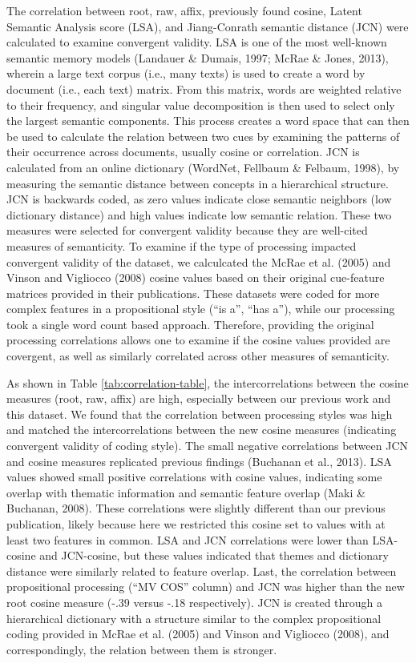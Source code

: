 \documentclass[english,,man]{apa6}
\theoremstyle{definition}
\theoremstyle{definition}
\theoremstyle{definition}
\theoremstyle{remark}
\begin{document}
The correlation between root, raw, affix, previously found cosine,
Latent Semantic Analysis score (LSA), and Jiang-Conrath semantic
distance (JCN) were calculated to examine convergent validity. LSA is
one of the most well-known semantic memory models (Landauer \& Dumais,
1997; McRae \& Jones, 2013), wherein a large text corpus (i.e., many
texts) is used to create a word by document (i.e., each text) matrix.
From this matrix, words are weighted relative to their frequency, and
singular value decomposition is then used to select only the largest
semantic components. This process creates a word space that can then be
used to calculate the relation between two cues by examining the
patterns of their occurrence across documents, usually cosine or
correlation. JCN is calculated from an online dictionary (WordNet,
Fellbaum \& Felbaum, 1998), by measuring the semantic distance between
concepts in a hierarchical structure. JCN is backwards coded, as zero
values indicate close semantic neighbors (low dictionary distance) and
high values indicate low semantic relation. These two measures were
selected for convergent validity because they are well-cited measures of
semanticity. To examine if the type of processing impacted convergent
validity of the dataset, we calculcated the McRae et al. (2005) and
Vinson and Vigliocco (2008) cosine values based on their original
cue-feature matrices provided in their publications. These datasets were
coded for more complex features in a propositional style (\enquote{is
a}, \enquote{has a}), while our processing took a single word count
based approach. Therefore, providing the original processing
correlations allows one to examine if the cosine values provided are
covergent, as well as similarly correlated across other measures of
semanticity.

As shown in Table \ref{tab:correlation-table}, the intercorrelations
between the cosine measures (root, raw, affix) are high, especially
between our previous work and this dataset. We found that the
correlation between processing styles was high and matched the
intercorrelations between the new cosine measures (indicating convergent
validity of coding style). The small negative correlations between JCN
and cosine measures replicated previous findings (Buchanan et al.,
2013). LSA values showed small positive correlations with cosine values,
indicating some overlap with thematic information and semantic feature
overlap (Maki \& Buchanan, 2008). These correlations were slightly
different than our previous publication, likely because here we
restricted this cosine set to values with at least two features in
common. LSA and JCN correlations were lower than LSA-cosine and
JCN-cosine, but these values indicated that themes and dictionary
distance were similarly related to feature overlap. Last, the
correlation between propositional processing (\enquote{MV COS} column)
and JCN was higher than the new root cosine measure (-.39 versus -.18
respectively). JCN is created through a hierarchical dictionary with a
structure similar to the complex propositional coding provided in McRae
et al. (2005) and Vinson and Vigliocco (2008), and correspondingly, the
relation between them is stronger.
\end{document}
